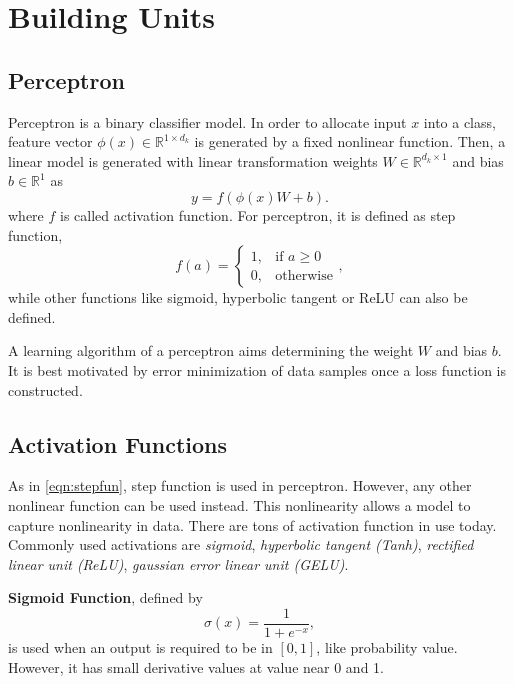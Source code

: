 \section{Building Units}
\label{sec:building_units}

\subsection{Perceptron}

Perceptron is a binary classifier model. 
In order to allocate input $x$ into a class, feature vector $\phi(x) \in \mathbb{R}^{1 \times d_k}$ is generated by a fixed nonlinear function. 
Then, a linear model is generated with linear transformation weights $W \in \mathbb{R}^{d_k \times 1}$ and bias $b \in \mathbb{R}^{1}$ as 
\begin{equation}
\label{eqn:perceptron1}
y = f(\phi(x) W + b).
\end{equation}
where $f$ is called activation function. 
For perceptron, it is defined as step function, 
\begin{equation}
\label{eqn:stepfun}
f(a) = 
\begin{cases}
1,   & \text{if } a\geq 0\\
0,   & \text{otherwise}
\end{cases},
\end{equation}
while other functions like sigmoid, hyperbolic tangent or ReLU can also be defined. 

A learning algorithm of a perceptron aims determining the weight $W$ and bias $b$. 
It is best motivated by error minimization of data samples once a loss function is constructed. 

\subsection{Activation Functions}

As in \eqref{eqn:stepfun}, step function is used in perceptron. 
However, any other nonlinear function can be used instead. 
This nonlinearity allows a model to capture nonlinearity in data. 
There are tons of activation function in use today. 
Commonly used activations are \textit{sigmoid}, \textit{hyperbolic tangent (Tanh)}, \textit{rectified linear unit (ReLU)}, \textit{gaussian error linear unit (GELU)}. 

\textbf{Sigmoid Function}, defined by 
\begin{equation}
\label{eqn:sigmoid_fcn}
\sigma(x) = \frac{1}{1+e^{-x}},
\end{equation}
is used when an output is required to be in $[0,1]$, like probability value. However, it has small derivative values at value near 0 and 1. 


